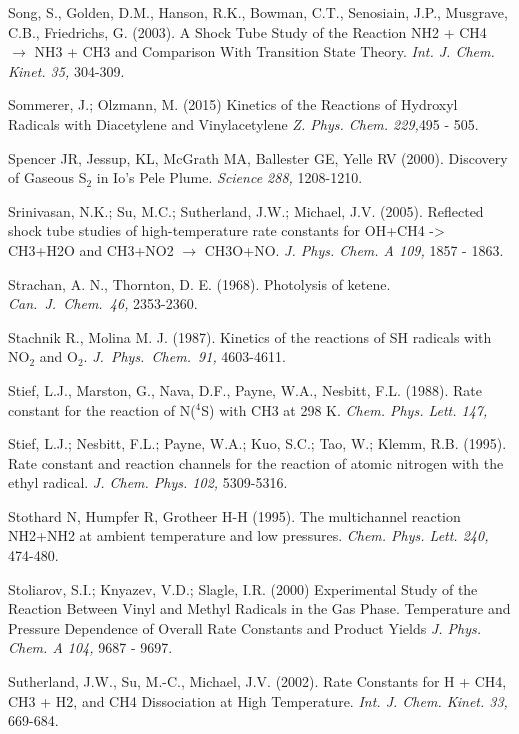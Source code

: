 \documentclass[12pt,landscape]{article}
\newcounter{reaction}
\begin{document}
Song, S., Golden, D.M., Hanson, R.K., Bowman, C.T., Senosiain, J.P., Musgrave, C.B., Friedrichs, G. (2003). A Shock Tube Study of the Reaction NH2 + CH4 $\rightarrow$ NH3 + CH3 and Comparison With Transition State Theory.  {\em Int. J. Chem. Kinet. 35,} 304-309.

Sommerer, J.; Olzmann, M. (2015)
 Kinetics of the Reactions of Hydroxyl Radicals with Diacetylene and Vinylacetylene
{\em Z. Phys. Chem. 229,}495 - 505.

Spencer JR, Jessup, KL, McGrath MA, Ballester GE, Yelle RV (2000). Discovery of Gaseous S$_2$ in Io's Pele Plume. {\em Science 288,} 1208-1210.

Srinivasan, N.K.; Su, M.C.; Sutherland, J.W.; Michael, J.V. (2005).  Reflected shock tube studies of high-temperature rate constants for OH+CH4 -> CH3+H2O and CH3+NO2 $\rightarrow$ CH3O+NO.  {\em J. Phys. Chem. A  109,}  1857 - 1863.

Strachan, A. N., Thornton, D. E. (1968). Photolysis of ketene.  {\em  Can.\ J.\ Chem.\  46,} 2353-2360.

Stachnik R., Molina M. J.  (1987). Kinetics of the reactions of SH radicals with NO$_2$ and O$_2$. {\em  J.\ Phys.\ Chem.\  91,} 4603-4611.

Stief, L.J., Marston, G., Nava, D.F., Payne, W.A., Nesbitt, F.L. (1988). Rate constant for the reaction of N($^4$S) with CH3 at 298 K.  {\em Chem. Phys. Lett. 147,}

Stief, L.J.; Nesbitt, F.L.; Payne, W.A.; Kuo, S.C.; Tao, W.; Klemm, R.B. (1995). Rate constant and reaction channels for the reaction of atomic nitrogen with the ethyl radical. {\em  J. Chem. Phys. 102,} 5309-5316.

Stothard N, Humpfer R, Grotheer H-H (1995). The multichannel reaction NH2+NH2 at ambient temperature and low pressures. {\em Chem. Phys. Lett. 240,} 474-480.

Stoliarov, S.I.; Knyazev, V.D.; Slagle, I.R. (2000)
Experimental Study of the Reaction Between Vinyl and Methyl Radicals in the Gas Phase. Temperature and Pressure Dependence of Overall Rate Constants and Product Yields
{\em J. Phys. Chem. A 104,} 9687 - 9697.

Sutherland, J.W., Su, M.-C., Michael, J.V. (2002). Rate Constants for H + CH4, CH3 + H2, and CH4 Dissociation at High Temperature. {\em Int. J. Chem. Kinet. 33,} 669-684.
\end{document}
